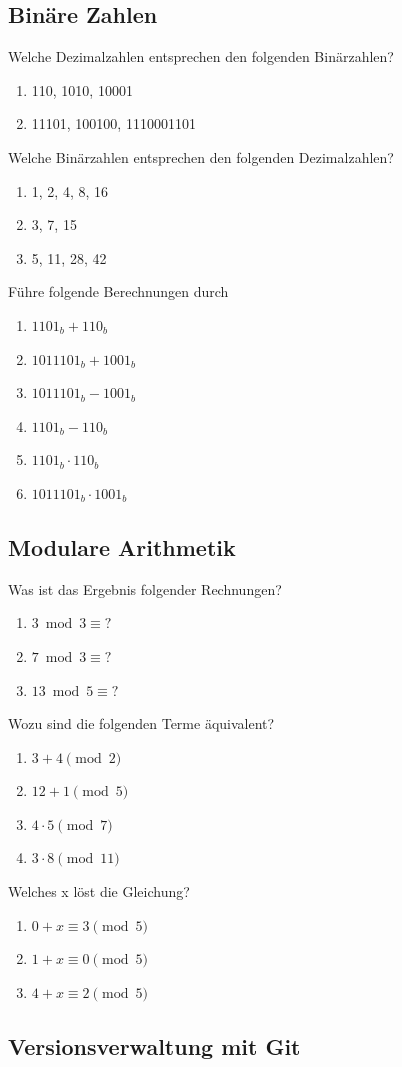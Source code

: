 \documentclass[11pt, a4paper]{article}
\begin{document}
\subsection{Binäre Zahlen}
Welche Dezimalzahlen entsprechen den folgenden Binärzahlen?
\begin{enumerate}
	\item 110, 1010, 10001
	\item 11101, 100100, 1110001101
\end{enumerate}
Welche Binärzahlen entsprechen den folgenden Dezimalzahlen?
\begin{enumerate}
	\item 1, 2, 4, 8, 16
	\item 3, 7, 15
	\item 5, 11, 28, 42
\end{enumerate}
Führe folgende Berechnungen durch
\begin{enumerate}
	\item $1101_b + 110_b$
	\item $1011101_b + 1001_b$
	\item $1011101_b - 1001_b$
	\item $1101_b - 110_b$
	\item $1101_b \cdot 110_b$
	\item $1011101_b \cdot 1001_b$
\end{enumerate}

\subsection{Modulare Arithmetik}
Was ist das Ergebnis folgender Rechnungen?
\begin{enumerate}
	\item $3 \bmod 3 \equiv \text{?}$
	\item $7 \bmod 3 \equiv \text{?}$
	\item $13 \bmod 5 \equiv \text{?}$
\end{enumerate}
Wozu sind die folgenden Terme äquivalent?
\begin{enumerate}
	\item $3 + 4 \pmod 2$
	\item $12 + 1 \pmod 5$
	\item $4 \cdot 5 \pmod 7$
	\item $3 \cdot 8 \pmod {11}$
\end{enumerate}
Welches x löst die Gleichung?
\begin{enumerate}
	\item $0 + x \equiv 3 \pmod 5$
	\item $1 + x \equiv 0 \pmod 5$
	\item $4 + x \equiv 2 \pmod 5$
\end{enumerate}

\subsection{Versionsverwaltung mit Git}
\end{document}
